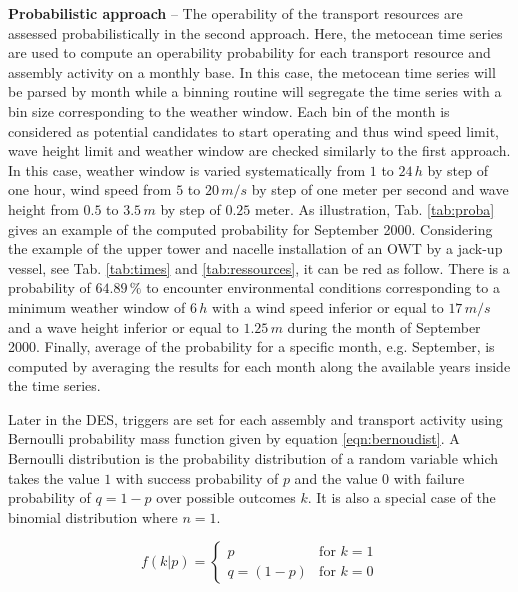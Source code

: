 \textbf{Probabilistic approach} -- The operability of the transport resources are assessed probabilistically in the second approach. Here, the metocean time series are used to compute an operability probability for each transport resource and assembly activity on a monthly base. In this case, the metocean time series will be parsed by month while a binning routine will segregate the time series with a bin size corresponding to the weather window. Each bin of the month is considered as potential candidates to start operating and thus wind speed limit, wave height limit and weather window are checked similarly to the first approach. In this case, weather window is varied systematically from $1$ to $24\, h$ by step of one hour, wind speed from $5$ to $20\, m/s$ by step of one meter per second and wave height from $0.5$ to $3.5\, m$ by step of $0.25$ meter. As illustration, Tab. \ref{tab:proba} gives an example of the computed probability for September 2000. Considering the example of the upper tower and nacelle installation of an OWT by a jack-up vessel, see Tab. \ref{tab:times} and \ref{tab:ressources}, it can be red as follow. There is a probability of $64.89\, \%$ to encounter environmental conditions corresponding to a minimum weather window of $6\, h$ with a wind speed inferior or equal to $17\, m/s$ and a wave height inferior or equal to $1.25\, m$ during the month of September 2000. Finally, average of the probability for a specific month, e.g. September, is computed by averaging the results for each month along the available years inside the time series.


Later in the DES, triggers are set for each assembly and transport activity using Bernoulli probability mass function given by equation \ref{eqn:bernoudist}. A Bernoulli distribution is the probability distribution of a random variable which takes the value $1$ with success probability of $p$ and the value $0$ with failure probability of $q=1-p$ over possible outcomes $k$. It is also a special case of the binomial distribution where $n=1$.

\begin{equation}
\label{eqn:bernoudist}
f\left(k \vert p \right) = \begin{cases} p & \text{for $k=1$} \\ q=(1-p) & \text{for $k=0$} \end{cases}
\end{equation}

